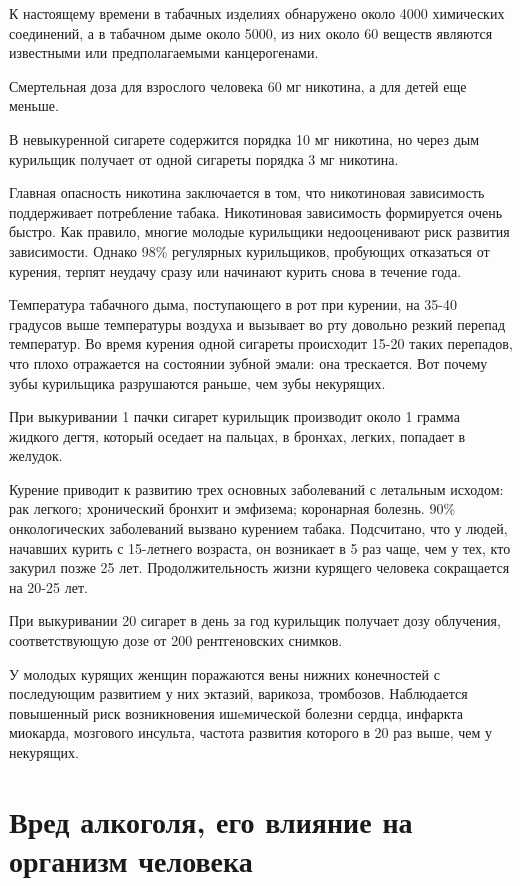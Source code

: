 К настоящему времени в табачных изделиях обнаружено около 4000 химических соединений, а в табачном дыме около 5000, из них около 60 веществ являются известными или предполагаемыми канцерогенами.

Смертельная доза для взрослого человека 60 мг никотина, а для детей еще меньше.

В невыкуренной сигарете содержится порядка 10 мг никотина, но через дым курильщик получает от одной сигареты порядка 3 мг никотина.

Главная опасность никотина заключается в том, что никотиновая зависимость поддерживает потребление табака. Никотиновая зависимость формируется очень быстро. Как правило, многие молодые курильщики недооценивают риск развития зависимости. Однако 98\% регулярных курильщиков, пробующих отказаться от курения, терпят неудачу сразу или начинают курить снова в течение года.

Температура табачного дыма, поступающего в рот при курении, на 35-40 градусов выше температуры воздуха и вызывает во рту довольно резкий перепад температур. Во время курения одной сигареты происходит 15-20 таких перепадов, что плохо отражается на состоянии зубной эмали: она трескается. Вот почему зубы курильщика разрушаются раньше, чем зубы некурящих.

При выкуривании 1 пачки сигарет курильщик производит около 1 грамма жидкого дегтя, который оседает на пальцах, в бронхах, легких, попадает в желудок.

Курение приводит к развитию трех основных заболеваний с летальным исходом: рак легкого; хронический бронхит и эмфизема; коронарная болезнь. 90\% онкологических заболеваний вызвано курением табака. Подсчитано, что у людей, начавших курить с 15-летнего возраста, он возникает в 5 раз чаще, чем у тех, кто закурил позже 25 лет. Продолжительность жизни курящего человека сокращается на 20-25 лет.

При выкуривании 20 сигарет в день за год курильщик получает дозу облучения, соответствующую дозе от 200 рентгеновских снимков.

У молодых курящих женщин поражаются вены нижних конечностей с последующим развитием у них эктазий, варикоза, тромбозов. Наблюдается повышенный риск возникновения ишeмической болезни сердца, инфаркта миокарда, мозгового инсульта, частота развития которого в 20 раз выше, чем у некурящих.

\newpage
\section{Вред алкоголя, его влияние на организм человека }

